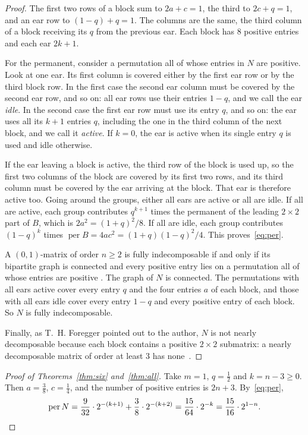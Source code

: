 \documentclass[11pt]{amsart}
\theoremstyle{remark}
\DeclareMathOperator{\per}{per}
\newcommand{\half}{\tfrac12}
\begin{document}
\begin{proof}
The first two rows of a block sum to $2a+c=1$, the third to $2c+q=1$, and an
ear row to $(1-q)+q=1$. The columns are the same, the third column of a block
receiving its $q$ from the previous ear. Each block has $8$ positive entries
and each ear $2k+1$.

For the permanent, consider a permutation all of whose entries in $N$ are
positive. Look at one ear. Its first column is covered either by the first ear
row or by the third block row. In the first case the second ear column must be
covered by the second ear row, and so on: all ear rows use their entries
$1-q$, and we call the ear \emph{idle}. In the second case the first ear row
must use its entry $q$, and so on: the ear uses all its $k+1$ entries $q$,
including the one in the third column of the next block, and we call it
\emph{active}. If $k=0$, the ear is active when its single entry $q$ is used and
idle otherwise.

If the ear leaving a block is active, the third row of the block is used up,
so the first two columns of the block are covered by its first two rows, and
its third column must be covered by the ear arriving at the block. That ear is
therefore active too. Going around the groups, either all ears are active or
all are idle. If all are active, each group contributes $q^{k+1}$ times the
permanent of the leading $2\times2$ part of $B$, which is $2a^2=(1+q)^2/8$. If
all are idle, each group contributes $(1-q)^{k}$ times
$\per B=4ac^2=(1+q)(1-q)^2/4$. This proves~\eqref{eq:per}.

A $(0,1)$-matrix of order $n\ge2$ is fully indecomposable if and only if its
bipartite graph is connected and every positive entry lies on a permutation
all of whose entries are positive \cite[Section~4.2]{BrualdiRyser}. The graph
of $N$ is connected. The permutations with all ears active cover every entry
$q$ and the four entries $a$ of each block, and those with all ears idle cover
every entry $1-q$ and every positive entry of each block. So $N$ is fully
indecomposable.

Finally, as T.~H. Foregger pointed out to the author, $N$ is not nearly
decomposable because each block contains a positive $2\times2$ submatrix: a
nearly decomposable matrix of order at least $3$ has none~\cite[Lemma~2.3]{Lavi}.
\end{proof}

\begin{proof}[Proof of Theorems~\ref{thm:six} and~\ref{thm:all}]
Take $m=1$, $q=\half$ and $k=n-3\ge0$. Then $a=\frac38$, $c=\frac14$, and the
number of positive entries is $2n+3$. By~\eqref{eq:per},
\[
  \per N=\frac{9}{32}\cdot2^{-(k+1)}+\frac{3}{8}\cdot2^{-(k+2)}
        =\frac{15}{64}\cdot2^{-k}=\frac{15}{16}\cdot2^{1-n}.\qedhere
\]
\end{proof}
\end{document}
